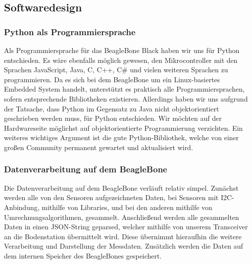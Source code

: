 \subsection{Softwaredesign}
\subsubsection{Python als Programmiersprache}
Als Programmiersprache für das BeagleBone Black haben wir uns für Python entschieden. Es wäre ebenfalls möglich gewesen, den Mikrocontroller mit den Sprachen JavaScript, Java, C, C++, C\# und vielen weiteren Sprachen zu programmieren. Da es sich bei dem BeagleBone um ein Linux-basiertes Embedded System handelt, unterstützt es praktisch alle Programmiersprachen, sofern entsprechende Bibliotheken existieren. Allerdings haben wir uns aufgrund der Tatsache, dass Python im Gegensatz zu Java nicht objektorientiert geschrieben werden muss, für Python entschieden. Wir möchten auf der Hardwareseite möglichst auf objektorientierte Programmierung verzichten. Ein weiteres wichtiges Argument ist die gute Python-Bibliothek, welche von einer großen Community permanent gewartet und aktualisiert wird.
\subsubsection{Datenverarbeitung auf dem BeagleBone}
Die Datenverarbeitung auf dem BeagleBone verläuft relativ simpel. Zunächst werden alle von den Sensoren aufgezeichneten Daten, bei Sensoren mit I2C-Anbindung, mithilfe von Libraries, und bei den anderen mithilfe von Umrechnungsalgorithmen, gesammelt. Anschließend werden alle gesammelten Daten in einen JSON-String geparsed, welcher mithilfe von unserem Transceiver an die Bodenstation übermittelt wird. Diese übernimmt hieraufhin die weitere Verarbeitung und Darstellung der Messdaten. Zusätzlich werden die Daten auf dem internen Speicher des BeagleBones gespeichert.

